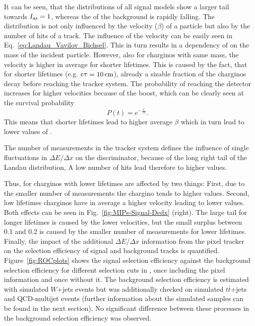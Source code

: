 It can be seen, that the \ias distributions of all signal models show a larger tail towards $I_{\text{as}}=1$, whereas the \ias of the background is rapidly falling.
The \ias distribution is not only influenced by the velocity ($\beta$) of a particle but also by the number of hits of a track.
The influence of the velocity can be easily seen in Eq.~\ref{eq:Landau_Vavilov_Bichsel}. 
This in turn results in a dependency of \ias on the mass of the incident particle.
However, also for charginos with same mass, the velocity is higher in average for shorter lifetimes.
This is caused by the fact, that for shorter lifetimes (e.g. $\text{c}\tau=10\,\text{cm}$), already a sizable fraction of the charginos decay before reaching the tracker system.
The probability of reaching the detector increases for higher velocities because of the boost, which can be clearly seen at the survival probability
\begin{equation}
P \left( t \right) = e^{-\frac{t}{\gamma \tau}}.
\end{equation} 
This means that shorter lifetimes lead to higher average $\beta$ which in turn lead to lower values of \ias.

The number of measurements in the tracker system defines the influence of single fluctuations in $\Delta E/\Delta x$ on the \ias discriminator, because of the long right tail of the Landau distribution, A low number of hits lead therefore to higher \ias values.

Thus, \ias for charginos with lower lifetimes are affected by two things: 
First, due to the smaller number of measurements the chargino tends to higher \ias values.
Second, low lifetimes charginos have in average a higher velocity leading to lower \ias values.
Both effects can be seen in Fig.~\ref{fig:MIPs-Signal-Dedx} (right).
The large tail for longer lifetimes is caused by the lower velocities, but the small surplus between 0.1 and 0.2 is caused by the smaller number of measurements for lower lifetimes.\\


Finally, the impact of the additional $\Delta E/\Delta x$ information from the pixel tracker on the selection efficiency of signal and background tracks is quantified.
Figure~\ref{fig:ROCplots} shows the signal selection efficiency against the background selection efficiency for different selection cuts in \ias, once including the pixel information and once without it.
The background selection efficiency is estimated with simulated $W$+jets  events but was additionally checked on simulated $t\bar{t}$+jets  and QCD-multijet events 
(further information about the simulated samples can be found in the next section).
No significant difference between these processes in the background selection efficiency was observed.

